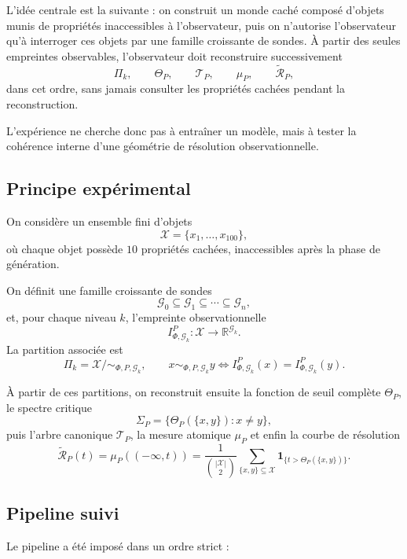 \documentclass[11pt,a4paper]{article}
\begin{document}
\begin{appendices}
L'idée centrale est la suivante : on construit un monde caché composé d'objets munis de propriétés inaccessibles à l'observateur, puis on n'autorise l'observateur qu'à interroger ces objets par une famille croissante de sondes. À partir des seules empreintes observables, l'observateur doit reconstruire successivement
\[
\Pi_k,\qquad \Theta_P,\qquad \mathcal T_P,\qquad \mu_P,\qquad \widetilde{\mathcal R}_P,
\]
dans cet ordre, sans jamais consulter les propriétés cachées pendant la reconstruction.

L'expérience ne cherche donc pas à entraîner un modèle, mais à tester la cohérence interne d'une géométrie de résolution observationnelle.

\subsection{Principe expérimental}

On considère un ensemble fini d'objets
\[
\mathcal X=\{x_1,\dots,x_{100}\},
\]
où chaque objet possède \(10\) propriétés cachées, inaccessibles après la phase de génération.

On définit une famille croissante de sondes
\[
\mathcal G_0\subseteq \mathcal G_1\subseteq \cdots \subseteq \mathcal G_n,
\]
et, pour chaque niveau \(k\), l'empreinte observationnelle
\[
I_{\Phi,\mathcal G_k}^P:\mathcal X\to \mathbb R^{\mathcal G_k}.
\]
La partition associée est
\[
\Pi_k=\mathcal X/{\sim_{\Phi,P,\mathcal G_k}},
\qquad
x\sim_{\Phi,P,\mathcal G_k}y
\Longleftrightarrow
I_{\Phi,\mathcal G_k}^P(x)=I_{\Phi,\mathcal G_k}^P(y).
\]

À partir de ces partitions, on reconstruit ensuite la fonction de seuil complète \(\Theta_P\), le spectre critique
\[
\Sigma_P=\{\Theta_P(\{x,y\}) : x\neq y\},
\]
puis l'arbre canonique \(\mathcal T_P\), la mesure atomique \(\mu_P\) et enfin la courbe de résolution
\[
\widetilde{\mathcal R}_P(t)
=
\mu_P((-\infty,t))
=
\frac{1}{\binom{|\mathcal X|}{2}}
\sum_{\{x,y\}\subseteq\mathcal X}
\mathbf 1_{\{t>\Theta_P(\{x,y\})\}}.
\]

\subsection{Pipeline suivi}

Le pipeline a été imposé dans un ordre strict :


\end{appendices}
\end{document}
